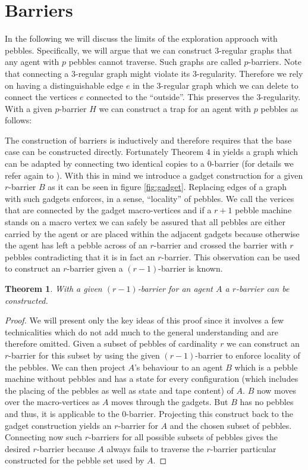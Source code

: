 \documentclass[draft,oneside]{scrartcl}
\newtheorem{thm}{Theorem}
\begin{document}
\section{Barriers}
In the following we will discuss the limits of the exploration approach with
pebbles. Specifically, we will argue that we can construct 3-regular graphs
that any agent with $p$ pebbles cannot traverse. Such graphs are called
$p$-barriers.
Note that connecting a 3-regular graph might violate its 3-regularity.
Therefore we rely on having a distinguishable edge $e$ in the 3-regular graph
which we can delete to connect the vertices $e$ connected to the
\enquote{outside}. This preserves the 3-regularity.
With a given $p$-barrier $H$ we can construct a trap for an agent with $p$
pebbles as follows:

The construction of barriers is inductively and therefore requires that the
base case can be constructed directly. Fortunately Theorem 4 in \cite{0barrier}
yields a graph which can be adapted by connecting two identical copies to a
0-barrier (for details we refer again to \cite{pebbles}). With this in mind we
introduce a gadget construction for a given $r$-barrier $B$ as it can be seen
in figure \ref{fig:gadget}. Replacing edges of a graph with
such gadgets enforces, in a sense, \enquote{locality} of pebbles. We call
the verices that are connected by the gadget macro-vertices and if a $r+1$
pebble machine stands on a macro vertex we can safely be assured that all
pebbles are either carried by the agent or are placed within the adjacent
gadgets because otherwise the agent has left a pebble across of an $r$-barrier
and crossed the barrier with $r$ pebbles contradicting that it is in fact an
$r$-barrier. This observation can be used to construct an $r$-barrier given
a $(r-1)$-barrier is known.
\begin{thm}
  With a given $(r-1)$-barrier for an agent $A$ a $r$-barrier can be
  constructed.
\end{thm}
\begin{proof}
  We will present only the key ideas of this proof since it involves a
  few technicalities which do not add much to the general understanding
  and are therefore omitted. Given a subset of pebbles of cardinality $r$
  we can construct an $r$-barrier for this subset by using the given
  $(r-1)$-barrier to enforce locality of the pebbles. We can then project
  $A$'s behaviour to an agent $B$ which is a pebble machine without pebbles
  and has a state for every configuration (which includes the placing of the
  pebbles as well as state and tape content) of $A$. $B$ now moves over the
  macro-vertices as $A$ moves through the gadgets. But $B$ has no pebbles and
  thus, it is applicable to the 0-barrier. Projecting this construct back to
  the gadget construction yields an $r$-barrier for $A$ and the chosen subset
  of pebbles. Connecting now such $r$-barriers for all possible subsets of
  pebbles gives the desired $r$-barrier because $A$ always fails to traverse
  the $r$-barrier particular constructed for the pebble set used by $A$.
\end{proof}
\end{document}
